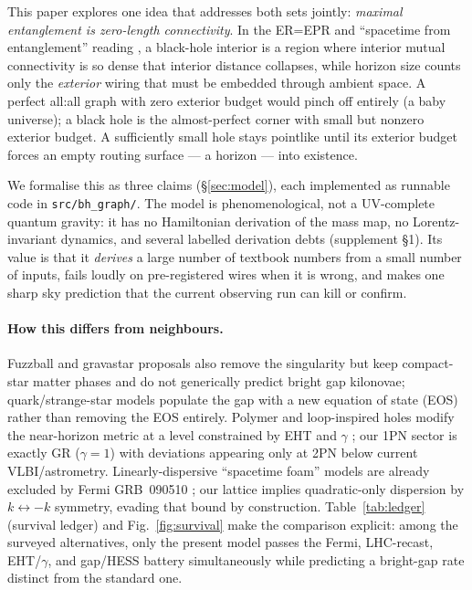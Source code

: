\documentclass[11pt]{article}
\begin{document}
This paper explores one idea that addresses both sets jointly:
\emph{maximal entanglement is zero-length connectivity}. In the ER=EPR and
``spacetime from entanglement'' reading \cite{VanRaamsdonk2010,Maldacena2013,RT06},
a black-hole interior is a region where interior mutual connectivity is so
dense that interior distance collapses, while horizon size counts only the
\emph{exterior} wiring that must be embedded through ambient space. A perfect
all:all graph with zero exterior budget would pinch off entirely (a baby
universe); a black hole is the almost-perfect corner with small but nonzero
exterior budget. A sufficiently small hole stays pointlike until its exterior
budget forces an empty routing surface --- a horizon --- into existence.

We formalise this as three claims (\S\ref{sec:model}), each implemented as
runnable code in \texttt{src/bh\_graph/}. The model is phenomenological, not a
UV-complete quantum gravity: it has no Hamiltonian derivation of the mass map,
no Lorentz-invariant dynamics, and several labelled derivation debts
(supplement \S1). Its value is that it \emph{derives} a large number of
textbook numbers from a small number of inputs, fails loudly on
pre-registered wires when it is wrong, and makes one sharp sky prediction
that the current observing run can kill or confirm.

\paragraph{How this differs from neighbours.}
Fuzzball \cite{Mathur05} and gravastar \cite{Mazur04} proposals also remove the singularity but keep
compact-star matter phases and do not generically predict bright gap
kilonovae; quark/strange-star models \cite{Witten84,EOSrev} populate the gap with a new equation of
state (EOS) rather than removing the EOS entirely. Polymer and loop-inspired
holes modify the near-horizon metric at a level constrained by EHT \cite{EHT19} and
$\gamma$ \cite{Bertotti03,Will14}; our 1PN sector is exactly GR ($\gamma = 1$) with deviations
appearing only at 2PN below current VLBI/astrometry. Linearly-dispersive
``spacetime foam'' models \cite{Amelino13} are already excluded by Fermi GRB~090510
\cite{Abdo2009}; our lattice implies quadratic-only dispersion by
$k \leftrightarrow -k$ symmetry, evading that bound by construction.
Table~\ref{tab:ledger} (survival ledger) and Fig.~\ref{fig:survival} make the
comparison explicit: among the surveyed alternatives, only the present model
passes the Fermi, LHC-recast, EHT/$\gamma$, and gap/HESS battery simultaneously
while predicting a bright-gap rate distinct from the standard one.
\end{document}
